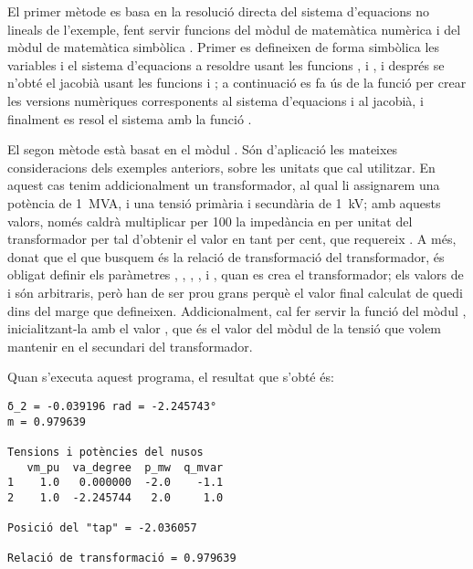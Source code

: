 El primer mètode es basa en la resolució directa del sistema d'equacions no lineals de l'exemple, fent servir funcions  del mòdul de matemàtica numèrica  i del mòdul de matemàtica simbòlica . Primer es defineixen de forma simbòlica les variables i el sistema d'equacions a resoldre usant les funcions ,  i , i després se n'obté el jacobià usant les funcions  i ; a continuació es fa ús de la funció   per crear les versions numèriques corresponents al sistema d'equacions i al jacobià, i finalment es resol el sistema amb la funció .

El segon mètode està basat en el mòdul . Són d'aplicació les mateixes consideracions dels exemples anteriors, sobre les unitats que cal utilitzar. En aquest cas tenim addicionalment un transformador, al qual li assignarem una potència de \qty{1}{MVA}, i una tensió primària i secundària de \qty{1}{kV}; amb aquests valors, només caldrà multiplicar per 100 la impedància en per unitat  del transformador per tal d'obtenir el valor en tant per cent, que requereix . A més, donat que el que busquem és la relació de transformació del transformador, és obligat definir els paràmetres , , , ,  i  , quan es crea el transformador; els valors de  i  són arbitraris, però han de ser prou grans perquè el valor final calculat de  quedi dins del marge que defineixen. Addicionalment, cal fer servir la funció  del mòdul , inicialitzant-la amb el valor , que és el valor del mòdul de la tensió que volem mantenir en el secundari del transformador.


Quan s'executa aquest programa, el resultat que s'obté és:
\lstset{
	language=,
	numbers=none,
	frame=none
}
\begin{lstlisting}
δ_2 = -0.039196 rad = -2.245743°
m = 0.979639

Tensions i potències del nusos
   vm_pu  va_degree  p_mw  q_mvar
1    1.0   0.000000  -2.0    -1.1
2    1.0  -2.245744   2.0     1.0

Posició del "tap" = -2.036057

Relació de transformació = 0.979639
\end{lstlisting}

